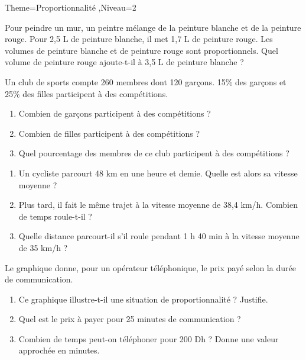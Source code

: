 \documentclass[a4paper,12pt]{article}
\begin{document}
\begin{Maquette}[Fiche]{Theme=Proportionnalité ,Niveau=2}
\begin{exercice}
Pour peindre un mur, un peintre mélange de la peinture blanche et de la peinture rouge. 
Pour 2,5 L de peinture blanche, il met 1,7 L de peinture rouge. Les volumes de peinture blanche et de peinture rouge sont proportionnels. 
Quel volume de peinture rouge ajoute-t-il à 3,5 L de peinture blanche ?
\end{exercice}

\begin{exercice}
Un club de sports compte 260 membres dont 120 garçons.
15\% des garçons et 25\% des filles participent à des compétitions.
\begin{enumerate}
\item Combien de garçons participent à des compétitions ?
\item Combien de filles participent à des compétitions ?
\item Quel pourcentage des membres de ce club participent à des compétitions ?
\end{enumerate}
\end{exercice}

\begin{exercice}
\begin{enumerate}
\item Un cycliste parcourt 48 km en une heure et demie. Quelle est alors sa vitesse moyenne ?
\item Plus tard, il fait le même trajet à la vitesse moyenne de 38,4 km/h. Combien de temps roule-t-il ?
\item Quelle distance parcourt-il s'il roule pendant 1 h 40 min à la vitesse moyenne de 35 km/h ?
\end{enumerate}
\end{exercice}

\begin{exercice}
\begin{minipage}{0.6\linewidth}
Le graphique donne, pour un opérateur téléphonique, le prix payé selon la durée de communication.
\begin{enumerate}
\item Ce graphique illustre-t-il une situation de
proportionnalité ? Justifie.
\item Quel est le prix à payer pour 25 minutes de
communication ?
\item Combien de temps peut-on téléphoner pour
200 Dh ? Donne une valeur approchée en minutes.
\end{enumerate}
\end{minipage}%
\begin{minipage}{0.4\linewidth}
\begin{flushright}
\end{flushright}
\end{minipage}
\end{exercice}


\end{Maquette}
\end{document}
